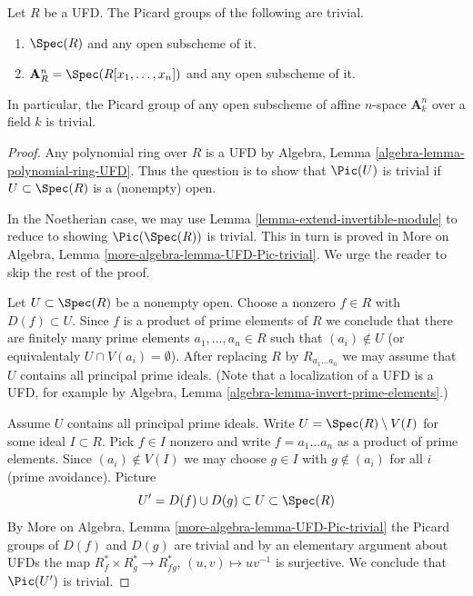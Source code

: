 \begin{lemma}
\label{lemma-open-subscheme-UFD}
Let $R$ be a UFD. The Picard groups of the following are
trivial.
\begin{enumerate}
\item $\Spec(R)$ and any open subscheme of it.
\item $\mathbf{A}^n_R = \Spec(R[x_1, \ldots, x_n])$ and any open subscheme
of it.
\end{enumerate}
In particular, the Picard group of any open subscheme of affine
$n$-space $\mathbf{A}^n_k$ over a field $k$ is trivial.
\end{lemma}

\begin{proof}
Any polynomial ring over $R$ is a UFD by
Algebra, Lemma \ref{algebra-lemma-polynomial-ring-UFD}.
Thus the question is to show that $\Pic(U)$ is trivial
if $U \subset \Spec(R)$ is a (nonempty) open.

\medskip\noindent
In the Noetherian case, we may use Lemma \ref{lemma-extend-invertible-module}
to reduce to showing $\Pic(\Spec(R))$ is trivial. This in turn is
proved in More on Algebra, Lemma \ref{more-algebra-lemma-UFD-Pic-trivial}.
We urge the reader to skip the rest of the proof.

\medskip\noindent
Let $U \subset \Spec(R)$ be a nonempty open. Choose a nonzero $f \in R$
with $D(f) \subset U$. Since $f$ is a product of prime elements of $R$
we conclude that there are finitely many prime elements
$a_1, \ldots, a_n \in R$ such that $(a_i) \not \in U$ (or
equivalentaly $U \cap V(a_i) = \emptyset$).
After replacing $R$ by $R_{a_1 \ldots a_n}$ we may assume that
$U$ contains all principal prime ideals. (Note that a localization
of a UFD is a UFD, for example by Algebra, Lemma
\ref{algebra-lemma-invert-prime-elements}.)

\medskip\noindent
Assume $U$ contains all principal prime ideals.
Write $U = \Spec(R) \setminus V(I)$ for some ideal $I \subset R$.
Pick $f \in I$ nonzero and write $f = a_1 \ldots a_n$ as a product
of prime elements. Since $(a_i) \not \in V(I)$ we may choose $g \in I$ with
$g \not \in (a_i)$ for all $i$ (prime avoidance). Picture
$$
U' = D(f) \cup D(g) \subset U \subset \Spec(R)
$$
By More on Algebra, Lemma \ref{more-algebra-lemma-UFD-Pic-trivial}
the Picard groups of $D(f)$ and $D(g)$ are trivial and by an elementary
argument about UFDs the map $R_f^* \times R_g^* \to R_{fg}^*$,
$(u, v) \mapsto uv^{-1}$ is surjective. We conclude that
$\Pic(U')$ is trivial.


\end{proof}
